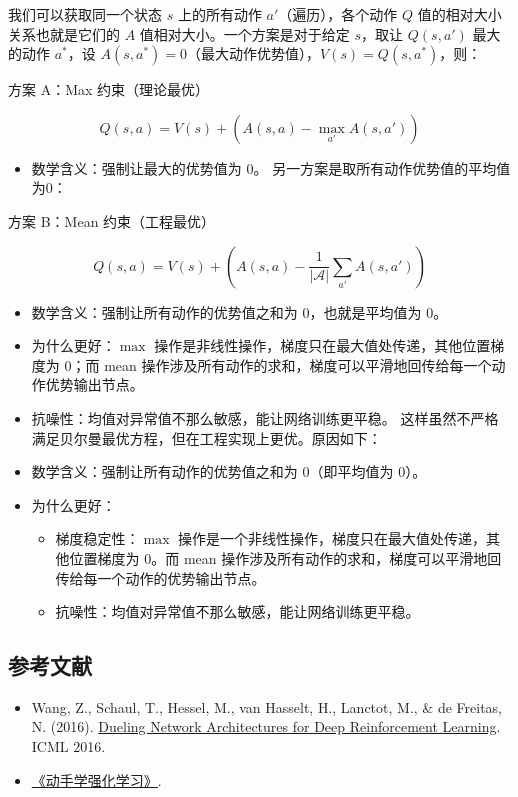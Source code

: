 我们可以获取同一个状态 \(s\) 上的所有动作 \(a'\)（遍历），各个动作 \(Q\) 值的相对大小关系也就是它们的 \(A\) 值相对大小。一个方案是对于给定 \(s\)，取让 \(Q(s,a')\) 最大的动作 \(a^*\)，设 \(A(s,a^*)=0\)（最大动作优势值），\(V(s)=Q(s,a^*)\)，则：

方案 A：Max 约束（理论最优）

\[
Q(s,a)=V(s)+(A(s,a)-\max_{a'}A(s,a'))
\]

\begin{itemize}
\tightlist
\item
  数学含义：强制让最大的优势值为 \(0\)。
  另一方案是取所有动作优势值的平均值为0：
\end{itemize}

方案 B：Mean 约束（工程最优）

\[
Q(s,a)=V(s)+(A(s,a)-\frac{1}{|\mathcal{A}|}\sum_{a'}A(s,a'))
\]

\begin{itemize}
\item
  数学含义：强制让所有动作的优势值之和为 \(0\)，也就是平均值为 \(0\)。
\item
  为什么更好：\(\max\) 操作是非线性操作，梯度只在最大值处传递，其他位置梯度为 \(0\)；而 mean 操作涉及所有动作的求和，梯度可以平滑地回传给每一个动作优势输出节点。
\item
  抗噪性：均值对异常值不那么敏感，能让网络训练更平稳。
  这样虽然不严格满足贝尔曼最优方程，但在工程实现上更优。原因如下：
\item
  数学含义：强制让所有动作的优势值之和为 \(0\)（即平均值为 \(0\)）。
\item
  为什么更好：

  \begin{itemize}
  \tightlist
  \item
    梯度稳定性：\(\max\) 操作是一个非线性操作，梯度只在最大值处传递，其他位置梯度为 \(0\)。而 mean 操作涉及所有动作的求和，梯度可以平滑地回传给每一个动作的优势输出节点。
  \item
    抗噪性：均值对异常值不那么敏感，能让网络训练更平稳。
  \end{itemize}
\end{itemize}

\hypertarget{ux53c2ux8003ux6587ux732e-50}{%
\subsection{参考文献}\label{ux53c2ux8003ux6587ux732e-50}}

\begin{itemize}
\tightlist
\item
  Wang, Z., Schaul, T., Hessel, M., van Hasselt, H., Lanctot, M., \& de Freitas, N. (2016). \href{https://arxiv.org/abs/1511.06581}{Dueling Network Architectures for Deep Reinforcement Learning}. ICML 2016.
\item
  \href{https://hrl.boyuai.com/}{《动手学强化学习》}.
\end{itemize}

